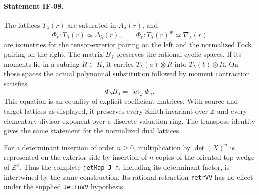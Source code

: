 \paragraph{Statement IF-08.}
The lattices $T_\lambda(r)$ are saturated in $A_\lambda(r)$, and
\[
 \Phi_r:T_\lambda(r)\simeq\Delta_\lambda(r),\qquad
 \Phi_r:T_\lambda(r)^\#\simeq\nabla_\lambda(r)       \tag{IF-08c}
\]
are isometries for the tensor-exterior pairing on the left and the
normalized Fock pairing on the right. The matrix $B_J$ preserves the
rational cyclic spaces. If its moments lie in a subring $R\subset K$,
it carries $T_\lambda(a)\otimes R$ into $T_\lambda(b)\otimes R$.
On those spaces the actual polynomial substitution followed by moment
contraction satisfies
\[
 \Phi_b B_J=\operatorname{jet}_J\Phi_a.             \tag{IF-08d}
\]
This equation is an equality of explicit coefficient matrices. With
source and target lattices as displayed, it preserves every
Smith invariant over $\mathbb Z$ and every elementary-divisor exponent
over a discrete valuation ring. The transpose identity gives the same
statement for the normalized dual lattices.

For a determinant insertion of order $n\geq0$, multiplication by
$\det(X)^n$ is represented on the exterior side by insertion of $n$
copies of the oriented top wedge of $\mathbb Z^a$. Thus the complete
\texttt{jetMap J n}, including its determinant factor, is intertwined
by the same construction. Its rational retraction \texttt{retrVV}
has no effect under the supplied \texttt{JetInVV} hypothesis.

